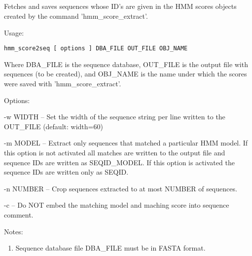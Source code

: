 

\subsection[hmm\_score2seq]{  }



Fetches and saves sequences whose ID's are given in the HMM scores
objects created by the command 'hmm\_score\_extract'.


\begin{description}


\item{Usage:}

{\tt hmm\_score2seq [ options ] DBA\_FILE OUT\_FILE OBJ\_NAME}

Where DBA\_FILE is the sequence database, OUT\_FILE is the output file
with sequences (to be created), and OBJ\_NAME is the name under which
the scores were saved with 'hmm\_score\_extract'.


\item{Options:}
\begin{description}
\item -w WIDTH -- Set the width of the sequence string per line written
to the OUT\_FILE (default: width=60)
\item -m MODEL -- Extract only sequences that matched a particular HMM
model. If this option is not activated all matches are written to
the output file and sequence IDs are written as SEQID\@PFAM\_MODEL.
If this option is activated the sequence IDs are written only as
SEQID.
\item -n NUMBER -- Crop sequences extracted to at most NUMBER of sequences.
\item -c -- Do NOT embed the matching model and maching score into sequence
comment.
\end{description}


\item{Notes:}
\begin{enumerate}
\item Sequence database file DBA\_FILE must be in FASTA format.
\end{enumerate}


\end{description}
